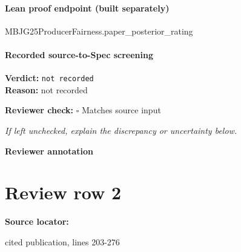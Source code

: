 \documentclass[10pt]{article}
\newcommand{\reviewerbox}{%
  \par\noindent\fbox{\parbox{0.96\linewidth}{\rule{0pt}{0.38in}}}\par
}
\newcommand{\reviewmatch}[1]{%
  \par\noindent\textbf{Reviewer check:} $\square$\; #1\par
  \noindent\emph{If left unchecked, explain the discrepancy or uncertainty below.}\par
}
\begin{document}
\paragraph{Lean proof endpoint (built separately)}\begin{ReviewVerbatim}
MBJG25ProducerFairness.paper_posterior_rating
\end{ReviewVerbatim}

\paragraph{Recorded source-to-Spec screening}
\textbf{Verdict:} \texttt{not recorded}
\\
\textbf{Reason:} not recorded
\reviewmatch{Matches source input}
\noindent\textbf{Reviewer annotation}\par
\reviewerbox
\clearpage
\hypertarget{source-claim-ec7384519273acb4}{}
\section*{Review row 2}
\textbf{Source locator:} {\footnotesize\raggedright cited publication, lines 203-\allowbreak{}276\par}
\end{document}
